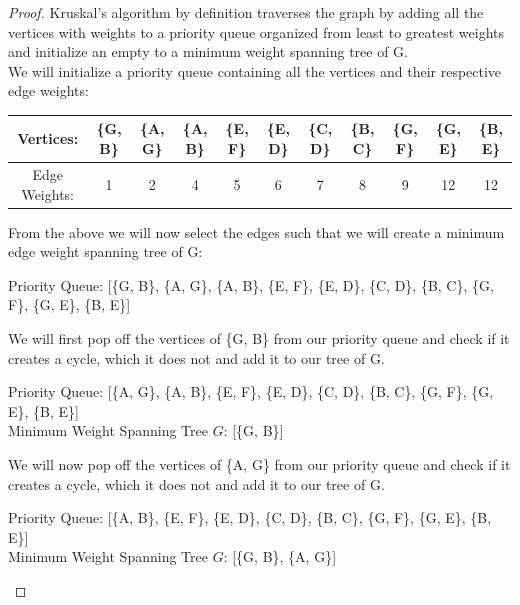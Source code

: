 \documentclass[11pt]{article}
\theoremstyle{definition}
\theoremstyle{definition}
\theoremstyle{definition}
\begin{document}
\begin{proof}
Kruskal's algorithm by definition traverses the graph by adding all the vertices with weights to a priority queue organized from least to greatest weights and initialize an empty to a minimum weight spanning tree of G. \\
We will initialize a priority queue containing all the vertices and their respective edge weights:\\
\begin{center}
\begin{tabular}{ | c | c | c | c | c | c | c | c | c | c | c |}
 \hline
 Vertices:& \{G, B\} & \{A, G\} & \{A, B\} & \{E, F\} & \{E, D\} & \{C, D\} & \{B, C\} & \{G, F\} & \{G, E\} & \{B, E\}\\ 
 \hline
 Edge Weights:& 1 & 2 & 4 & 5 & 6 & 7 & 8 & 9 & 12 & 12\\  
 \hline
\end{tabular}
\end{center}

From the above we will now select the edges such that we will create a minimum edge weight spanning tree of G:
\begin{center}
Priority Queue: [\{G, B\}, \{A, G\}, \{A, B\}, \{E, F\}, \{E, D\}, \{C, D\}, \{B, C\}, \{G, F\}, \{G, E\}, \{B, E\}] \\
\end{center}

We will first pop off the vertices of \{G, B\} from our priority queue and check if it creates a cycle, which it does not and add it to our tree of G. \\
\begin{center}
Priority Queue: [\{A, G\}, \{A, B\}, \{E, F\}, \{E, D\}, \{C, D\}, \{B, C\}, \{G, F\}, \{G, E\}, \{B, E\}]\\
Minimum Weight Spanning Tree $G$: [\{G, B\}] \\
\end{center}

We will now pop off the vertices of \{A, G\} from our priority queue and check if it creates a cycle, which it does not and add it to our tree of G. \\
\begin{center}
Priority Queue: [\{A, B\}, \{E, F\}, \{E, D\}, \{C, D\}, \{B, C\}, \{G, F\}, \{G, E\}, \{B, E\}]\\
Minimum Weight Spanning Tree $G$: [\{G, B\}, \{A, G\}] \\
\end{center}


\end{proof}
\end{document}
